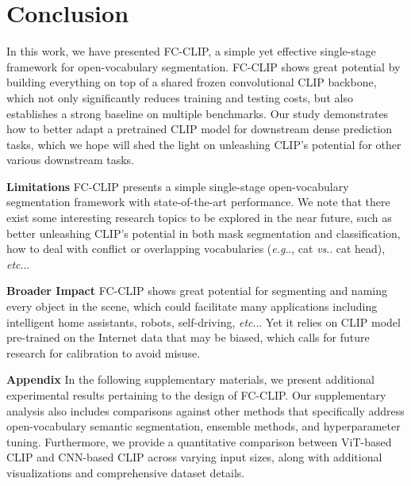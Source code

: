 \documentclass{article}
\makeatletter
\DeclareRobustCommand\onedot{\futurelet\@let@token\@onedot}
\def\@onedot{\ifx\@let@token.\else.\null\fi\xspace}
\def\eg{\emph{e.g}\onedot}
\def\etc{\emph{etc}\onedot}
\def\vs{\emph{vs}\onedot}
\newcommand{\modelname}{FC-CLIP\xspace}
\makeatother
\begin{document}
\section{Conclusion}
\label{Conclusions}
\vspace{-0.5ex}
In this work, we have presented \modelname, a simple yet effective single-stage framework for open-vocabulary segmentation.
\modelname shows great potential by building everything on top of a shared frozen convolutional CLIP backbone, which not only significantly reduces training and testing costs, but also establishes a strong baseline on multiple benchmarks.
Our study demonstrates how to better adapt a pretrained CLIP model for downstream dense prediction tasks, which we hope will shed the light on unleashing CLIP's potential for other various downstream tasks.

\vspace{-0.5ex}
\noindent \textbf{Limitations}\quad
\modelname presents a simple single-stage open-vocabulary segmentation framework with state-of-the-art performance. We note that there exist some interesting research topics to be explored in the near future, such as better unleashing CLIP's potential in both mask segmentation and classification, how to deal with conflict or overlapping vocabularies (\eg, cat \vs cat head), \etc.

\vspace{-0.5ex}
\noindent \textbf{Broader Impact}\quad
\modelname shows great potential for segmenting and naming every object in the scene, which could facilitate many applications including intelligent home assistants, robots, self-driving, \etc. Yet it relies on CLIP model pre-trained on the Internet data that may be biased, which calls for future research for calibration to avoid misuse. 
\clearpage
{\small


}


\clearpage


\noindent \textbf{Appendix}\quad
In the following supplementary materials, we present additional experimental results pertaining to the design of \modelname. Our supplementary analysis also includes comparisons against other methods that specifically address open-vocabulary semantic segmentation, ensemble methods, and hyperparameter tuning. Furthermore, we provide a quantitative comparison between ViT-based CLIP and CNN-based CLIP across varying input sizes, along with additional visualizations and comprehensive dataset details.
\end{document}
